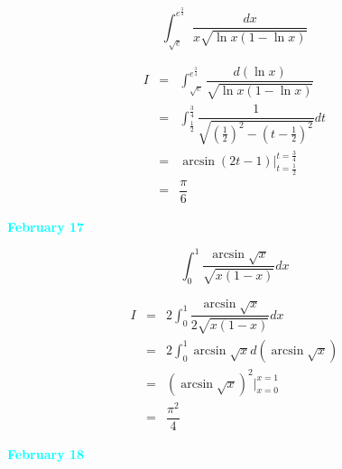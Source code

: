\begin{example}[][Exam: 28.3.4]
	$$\int_{\sqrt{e}}^{e^{\frac{3}{4}}}\dfrac{dx}{x\sqrt{\ln x(1-\ln x)}}$$
\end{example}
\begin{solution}
	\begin{eqnarray*}
		I & = & \int_{\sqrt{e}}^{e^{\frac{3}{4}}}\dfrac{d(\ln x)}{\sqrt{\ln x(1-\ln x)}}\\
		  & = & \int_{\frac{1}{2}}^{\frac{3}{4}}\dfrac{1}{\sqrt{(\frac{1}{2})^{2}-(t-\frac{1}{2})^{2}}}dt\\
		  & = & \arcsin(2t-1)\big|_{t=\frac{1}{2}}^{t=\frac{3}{4}}\\
		  & = & \dfrac{\pi}{6}
	\end{eqnarray*}
\end{solution}

\textcolor{cyan}{\textbf{February 17}}

\begin{example}[][Exam: 28.3.5]
	$$\int_{0}^{1}\dfrac{\arcsin \sqrt{x}}{\sqrt{x(1-x)}}dx$$
\end{example}
\begin{solution}
	\begin{eqnarray*}
		I & = & 2\int_{0}^{1}\dfrac{\arcsin \sqrt{x}}{2\sqrt{x(1-x)}}dx\\
		  & = & 2\int_{0}^{1}\arcsin \sqrt{x}d(\arcsin \sqrt{x})\\
		  & = & (\arcsin \sqrt{x})^{2}\big|_{x=0}^{x=1}\\
		  & = & \dfrac{\pi^{2}}{4}
	\end{eqnarray*}
\end{solution}

\textcolor{cyan}{\textbf{February 18}}

